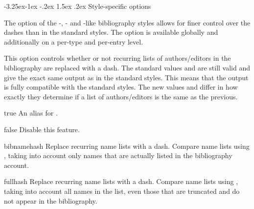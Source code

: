 \documentclass[11pt,a4paper]{article}
\makeatletter
\let\accentcolour\spotcolor
\newcommand*{\allsectionsfont}{\sffamily\accentcolour}
\renewcommand\subsection{\@startsection{subsection}{2}{\z@}%
                                       {-3.25ex\@plus -1ex \@minus -.2ex}%
                                       {1.5ex \@plus .2ex}%
                                       {\normalfont\large\bfseries\allsectionsfont}}
\makeatother
\begin{document}
\subsection{Style-specific options}\label{sec:opt:style}
\begin{optionlist}

The  option of the -,
-
and -like
bibliography styles allows for
finer control over the dashes than in the standard styles.
The option is available globally and additionally on a per-type and per-entry
level.

This option controls whether or not recurring lists of authors/editors in the
bibliography are replaced with a dash.
The standard values  and  are still valid and give
the exact same output as in the standard styles.
This means that the output is fully compatible with the standard styles.
The new values  and  differ in how exactly
they determine if a list of authors/editors is the same as the previous.
\begin{valuelist}
\item[true] An alias for .
\item[false] Disable this feature.
\item[bibnamehash] Replace recurring name lists with a dash.
                   Compare name lists using , taking
                   into account only names that are actually listed in the
                   bibliography account.
\item[fullhash] Replace recurring name lists with a dash.
                Compare name lists using , taking into
                account all names in the list, even those that are truncated
                and do not appear in the bibliography.
\end{valuelist}



\end{optionlist}
\end{document}
